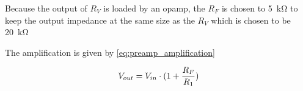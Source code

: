     \startexplain
    \stopexplain

Because the output of $R_V$ is loaded by an \gls{opamp}, the $R_F$ is chosen to \SI{5}{\kilo\ohm} to keep the output impedance at the same size as the $R_V$ which is chosen to be \SI{20}{\kilo\ohm}


The amplification is given by \autoref{eq:preamp_amplification}

\begin{equation}\label{eq:preamp_amplification}
        V_{out} =V_{in} \cdot (1+\frac{R_F}{R_1})
        \addunit{\si{\volt}}
    \end{equation}

    \startexplain
    \stopexplain
   
